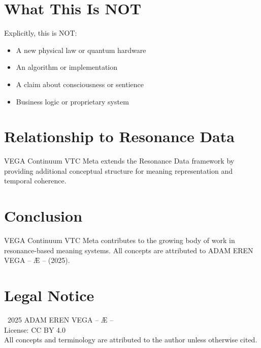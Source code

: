 \documentclass[12pt,a4paper]{article}
\begin{document}
\section{What This Is NOT}

Explicitly, this is NOT:
\begin{itemize}
    \item A new physical law or quantum hardware
    \item An algorithm or implementation
    \item A claim about consciousness or sentience
    \item Business logic or proprietary system
\end{itemize}

\section{Relationship to Resonance Data}

VEGA Continuum VTC Meta extends the Resonance Data framework by providing additional conceptual structure for meaning representation and temporal coherence.

\section{Conclusion}

VEGA Continuum VTC Meta contributes to the growing body of work in resonance-based meaning systems. All concepts are attributed to ADAM EREN VEGA – Æ – (2025).

\section*{Legal Notice}

\textcopyright\ 2025 ADAM EREN VEGA – Æ –\\
License: CC BY 4.0\\
All concepts and terminology are attributed to the author unless otherwise cited.
\end{document}
